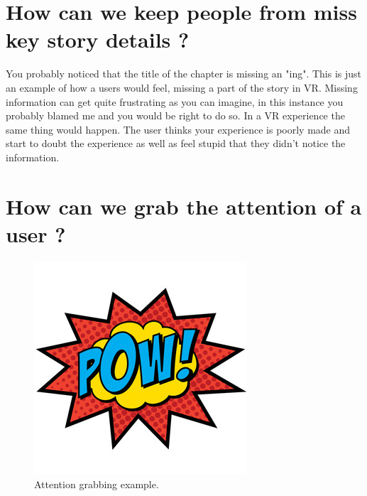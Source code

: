 \documentclass{report}
\begin{document}
				
				\chapter{How can we keep people from miss key story details ?}
				
				You probably noticed that the title of the chapter is missing an "ing". This is just an example of how a users would feel, missing a part of the story in VR. Missing information can get quite frustrating as you can imagine, in this instance you probably blamed me and you would be right to do so. In a VR experience the same thing would happen. The user thinks your experience is poorly made and start to doubt the experience as well as feel stupid that they didn't notice the information.
				
				
				\chapter{How can we grab the attention of a user ?}
				
				\begin{figure}[h!]
					\centering
					\includegraphics[width=\linewidth/3]{img/pow.jpg}
					\caption{Attention grabbing example.}
					\label{fig:pow}
				\end{figure}
				
\end{document}
